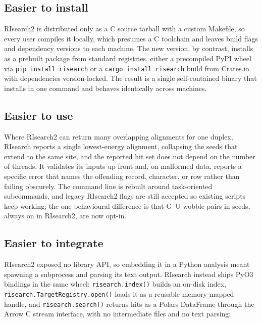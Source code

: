\subsection*{Easier to install}

RIsearch2 is distributed only as a C source tarball with a custom Makefile, so every user compiles it locally, which presumes a C toolchain and leaves build flags and dependency versions to each machine.
The new version, by contrast, installs as a prebuilt package from standard registries, either a precompiled PyPI wheel via \texttt{pip install risearch} or a \texttt{cargo install risearch} build from Crates.io with dependencies version-locked.
The result is a single self-contained binary that installs in one command and behaves identically across machines.

\subsection*{Easier to use}

Where RIsearch2 can return many overlapping alignments for one duplex, RIsearch reports a single lowest-energy alignment, collapsing the seeds that extend to the same site, and the reported hit set does not depend on the number of threads.
It validates its inputs up front and, on malformed data, reports a specific error that names the offending record, character, or row rather than failing obscurely.
The command line is rebuilt around task-oriented subcommands, and legacy RIsearch2 flags are still accepted so existing scripts keep working; the one behavioural difference is that G--U wobble pairs in seeds, always on in RIsearch2, are now opt-in.

\subsection*{Easier to integrate}

RIsearch2 exposed no library API, so embedding it in a Python analysis meant spawning a subprocess and parsing its text output.
RIsearch instead ships PyO3 bindings in the same wheel: \texttt{risearch.index()} builds an on-disk index, \texttt{risearch.TargetRegistry.open()} loads it as a reusable memory-mapped handle, and \texttt{risearch.search()} returns hits as a Polars DataFrame through the Arrow C stream interface, with no intermediate files and no text parsing:


